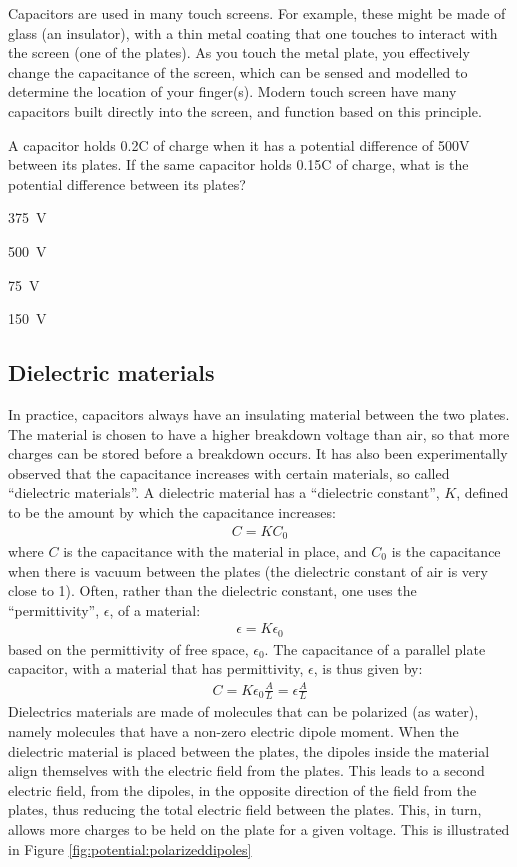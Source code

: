 Capacitors are used in many touch screens. For example, these might be made of glass (an insulator), with a thin metal coating that one touches to interact with the screen (one of the plates). As you touch the metal plate, you effectively change the capacitance of the screen, which can be sensed and modelled to determine the location of your finger(s). Modern touch screen have many capacitors built directly into the screen, and function based on this principle. 

\begin{checkpoint}
	\begin{MCquestion}{A capacitor holds 0.2C of charge when it has a potential difference of 500V between its plates. If the same capacitor holds 0.15C of charge, what is the potential difference between its plates?}
		\item \SI{375}{V} \correct
		\item \SI{500}{V}
		\item \SI{75}{V}
		\item \SI{150}{V}
	\end{MCquestion}
\end{checkpoint}

\subsection{Dielectric materials}
In practice, capacitors always have an insulating material between the two plates. The material is chosen to have a higher breakdown voltage than air, so that more charges can be stored before a breakdown occurs. It has also been experimentally observed that the capacitance increases with certain materials, so called ``dielectric materials''. A dielectric material has a ``dielectric constant'', $K$, defined to be the amount by which the capacitance increases:
\begin{align*}
C=KC_0
\end{align*}
where $C$ is the capacitance with the material in place, and $C_0$ is the capacitance when there is vacuum between the plates (the dielectric constant of air is very close to 1). Often, rather than the dielectric constant, one uses the ``permittivity'', $\epsilon$, of a material:
\begin{align*}
\epsilon=K\epsilon_0
\end{align*}
based on the permittivity of free space, $\epsilon_0$. The capacitance of a parallel plate capacitor, with a material that has permittivity, $\epsilon$, is thus given by:
\begin{align*}
C=K\epsilon_0\frac{A}{L}=\epsilon\frac{A}{L}
\end{align*}
Dielectrics materials are made of molecules that can be polarized (as water), namely molecules that have a non-zero electric dipole moment. When the dielectric material is placed between the plates, the dipoles inside the material align themselves with the electric field from the plates. This leads to a second electric field, from the dipoles, in the opposite direction of the field from the plates, thus reducing the total electric field between the plates. This, in turn, allows more charges to be held on the plate for a given voltage. This is illustrated in Figure \ref{fig:potential:polarizeddipoles}

